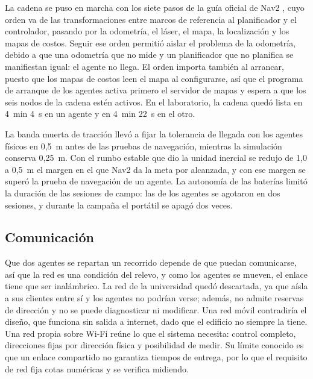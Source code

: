 La cadena se puso en marcha con los siete pasos de la guía oficial de Nav2 \autocite{nav2setup}, cuyo orden va de las transformaciones entre marcos de referencia al planificador y el controlador, pasando por la odometría, el láser, el mapa, la localización y los mapas de costos. Seguir ese orden permitió aislar el problema de la odometría, debido a que una odometría que no mide y un planificador que no planifica se manifiestan igual: el agente no llega. El orden importa también al arrancar, puesto que los mapas de costos leen el mapa al configurarse, así que el programa de arranque de los agentes activa primero el servidor de mapas y espera a que los seis nodos de la cadena estén activos. En el laboratorio, la cadena quedó lista en 4~min 4~s en un agente y en 4~min 22~s en el otro.

La banda muerta de tracción llevó a fijar la tolerancia de llegada con los agentes físicos en 0,5~m antes de las pruebas de navegación, mientras la simulación conserva 0,25~m. Con el rumbo estable que dio la unidad inercial se redujo de 1,0 a 0,5~m el margen en el que Nav2 da la meta por alcanzada, y con ese margen se superó la prueba de navegación de un agente. La autonomía de las baterías limitó la duración de las sesiones de campo: las de los agentes se agotaron en dos sesiones, y durante la campaña el portátil se apagó dos veces.

\subsection{Comunicación}
\label{sec:dos-vehiculos}
\label{sec:red}

Que dos agentes se repartan un recorrido depende de que puedan comunicarse, así que la red es una condición del relevo, y como los agentes se mueven, el enlace tiene que ser inalámbrico. La red de la universidad quedó descartada, ya que aísla a sus clientes entre sí y los agentes no podrían verse; además, no admite reservas de dirección y no se puede diagnosticar ni modificar. Una red móvil contradiría el diseño, que funciona sin salida a internet, dado que el edificio no siempre la tiene. Una red propia sobre Wi-Fi reúne lo que el sistema necesita: control completo, direcciones fijas por dirección física y posibilidad de medir. Su límite conocido es que un enlace compartido no garantiza tiempos de entrega, por lo que el requisito de red fija cotas numéricas y se verifica midiendo.

